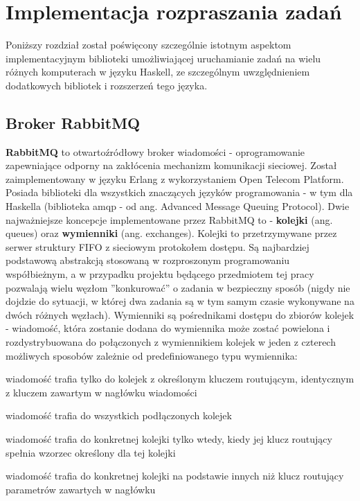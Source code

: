 
\chapter{Implementacja rozpraszania zadań}
Poniższy rozdział został poświęcony szczególnie istotnym aspektom implementacyjnym biblioteki umożliwiającej uruchamianie zadań na wielu różnych komputerach w języku Haskell, ze szczególnym uwzględnieniem dodatkowych bibliotek i rozszerzeń tego języka.

\section{Broker RabbitMQ}
\textbf{RabbitMQ} to otwartoźródłowy broker wiadomości - oprogramowanie zapewniające odporny na zakłócenia mechanizm komunikacji sieciowej. Został zaimplementowany w języku Erlang z wykorzystaniem Open Telecom Platform. Posiada biblioteki dla wszystkich znaczących języków programowania - w tym dla Haskella (biblioteka amqp - od ang. Advanced Message Queuing Protocol). Dwie najważniejsze koncepcje implementowane przez RabbitMQ to - \textbf{kolejki} (ang. queues) oraz \textbf{wymienniki} (ang. exchanges). Kolejki to przetrzymywane przez serwer struktury FIFO z sieciowym protokołem dostępu. Są najbardziej podstawową abstrakcją stosowaną w rozproszonym programowaniu współbieżnym, a w przypadku projektu będącego przedmiotem tej pracy pozwalają wielu węzłom ''konkurować'' o zadania w bezpieczny sposób (nigdy nie dojdzie do sytuacji, w której dwa zadania są w tym samym czasie wykonywane na dwóch różnych węzłach). Wymienniki są pośrednikami dostępu do zbiorów kolejek - wiadomość, która zostanie dodana do wymiennika może zostać powielona i rozdystrybuowana do połączonych z wymiennikiem kolejek w jeden z czterech możliwych sposobów zależnie od predefiniowanego typu wymiennika:
\begin{description}[align=right,labelwidth=3cm,leftmargin=3cm]
  \item [direct] wiadomość trafia tylko do kolejek z określonym kluczem routującym, identycznym z kluczem zawartym w nagłówku wiadomości
  \item [fanout] wiadomość trafia do wszystkich podłączonych kolejek
  \item [topic] wiadomość trafia do konkretnej kolejki tylko wtedy, kiedy jej klucz routujący spełnia wzorzec określony dla tej kolejki 
  \item [headers] wiadomość trafia do konkretnej kolejki na podstawie innych niż klucz routujący parametrów zawartych w nagłówku
\end{description}

